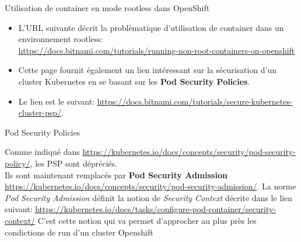 \begin{frame}[fragile]{Utilisation de container en mode rootless dans OpenShift}

   \begin{itemize}
\item L'URL suivante décrit la problèmatique d'utilisation de container dans un environnement rootless: \\
   \url{https://docs.bitnami.com/tutorials/running-non-root-containers-on-openshift} \\
\item Cette page fournit également un lien intéressant sur la sécurisation d'un cluster Kubernetes en se basant sur les \textbf{Pod Security Policies}.\\
\item Le lien est le suivant:
   \url{https://docs.bitnami.com/tutorials/secure-kubernetes-cluster-psp/}.
   \end{itemize}

\end{frame}


\begin{frame}[fragile]{Pod Security Policies}

   Comme indiqué dans \url{https://kubernetes.io/docs/concepts/security/pod-security-policy/}, les PSP sont dépréciés.\\
   Ils sont maintenant remplacés par \textbf{Pod Security Admission} \url{https://kubernetes.io/docs/concepts/security/pod-security-admission/}.
   La norme \textit{Pod Security Admission} définit la notion de \textit{Security Context} décrite dans le lien suivant:
   \url{https://kubernetes.io/docs/tasks/configure-pod-container/security-context/}
   C'est cette notion qui va permet d'approcher au plus près les condictions de run d'un cluster Openshift 

\end{frame}


